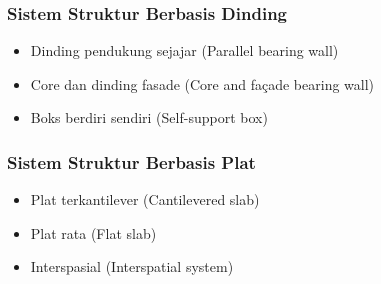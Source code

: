 \documentclass[../skb.tex]{subfiles}
\begin{document}
\begin{frame}[c,mybg=pg_7_1,mytitle=standard,dark] \end{frame}
\begin{frame}[c,mybg=pg_7_2,mytitle=standard,dark] \end{frame}
\begin{frame}[c,mybg=pg_7_3,mytitle=standard,dark] \end{frame}

\begin{frame}[label=current,c,mybg=pondasi,mytitle=standard,dark] \end{frame}

\begin{frame}[t,mycolor=digiPH_leaf,mytitle=standard,dark]
	\frametitle{Sistem Struktur Berbasis Dinding}

	\begin{itemize}
		\item Dinding pendukung sejajar (Parallel bearing wall)
		\item Core dan dinding fasade (Core and façade bearing wall)
		\item Boks berdiri sendiri (Self-support box)
	\end{itemize}

\end{frame}


\begin{frame}[t,mycolor=digiPH_leaf,mytitle=standard,dark]
	\frametitle{Sistem Struktur Berbasis Plat}

	\begin{itemize}
		\item Plat terkantilever (Cantilevered slab)
		\item Plat rata (Flat slab)
		\item Interspasial (Interspatial system)
	\end{itemize}

\end{frame}
\end{document}

